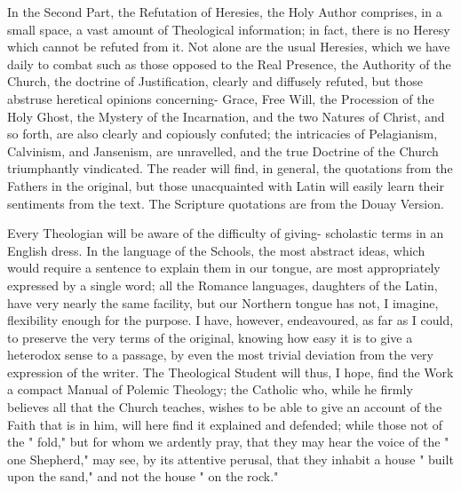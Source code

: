\documentclass[12pt]{book}
\begin{document}
In the Second Part, the Refutation of Heresies, the Holy Author comprises, in a small space, a vast
amount of Theological information; in fact, there is no Heresy which cannot be refuted from it. Not alone
are the usual Heresies, which we have daily to combat such as those opposed to the Real Presence, the
Authority of the Church, the doctrine of Justification, clearly and diffusely refuted, but those abstruse
heretical opinions concerning- Grace, Free Will, the Procession of the Holy Ghost, the Mystery of the
Incarnation, and the two Natures of Christ, and so forth, are also clearly and copiously confuted; the
intricacies of Pelagianism, Calvinism, and Jansenism, are unravelled, and the true Doctrine of the Church
triumphantly vindicated. The reader will find, in general, the quotations from the Fathers in the original,
but those unacquainted with Latin will easily learn their sentiments from the text. The Scripture 
quotations are from the Douay Version.

Every Theologian will be aware of the difficulty of giving- scholastic terms in an English dress. In the
language of the Schools, the most abstract ideas, which would require a sentence to explain them in our
tongue, are most appropriately expressed by a single word; all the Romance languages, daughters of the
Latin, have very nearly the same facility, but our Northern tongue has not, I imagine, flexibility enough
for the purpose. I have, however, endeavoured, as far as I could, to preserve the very terms of the
original, knowing how easy it is to give a heterodox sense to a passage, by even the most trivial deviation
from the very expression of the writer. The Theological Student will thus, I hope, find the Work a
compact Manual of Polemic Theology; the Catholic who, while he firmly believes all that the Church
teaches, wishes to be able to give an account of the Faith that is in him, will here find it explained and
defended; while those not of the " fold," but for whom we ardently pray, that they may hear the voice of
the " one Shepherd," may see, by its attentive perusal, that they inhabit a house " built upon the sand,"
and not the house " on the rock."
\end{document}
